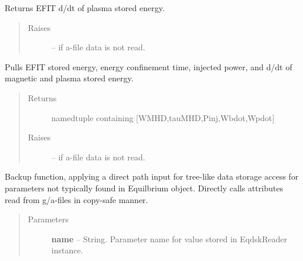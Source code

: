 \documentclass[letterpaper,10pt,english]{sphinxmanual}
\begin{document}
\begin{fulllineitems}
\begin{fulllineitems}
\end{fulllineitems}


\begin{fulllineitems}
\label{eqtools:eqtools.eqdskreader.EqdskReader.getWpdot}
Returns EFIT d/dt of plasma stored energy.
\begin{quote}\begin{description}
\item[{Raises }] \leavevmode
{} -- 
if a-file data is not read.

\end{description}\end{quote}

\end{fulllineitems}


\begin{fulllineitems}
\label{eqtools:eqtools.eqdskreader.EqdskReader.getEnergy}
Pulls EFIT stored energy, energy confinement time, injected power, and d/dt of magnetic and plasma stored energy.
\begin{quote}\begin{description}
\item[{Returns}] \leavevmode
namedtuple containing {[}WMHD,tauMHD,Pinj,Wbdot,Wpdot{]}

\item[{Raises }] \leavevmode
{} -- 
if a-file data is not read.

\end{description}\end{quote}

\end{fulllineitems}


\begin{fulllineitems}
\label{eqtools:eqtools.eqdskreader.EqdskReader.getParam}
Backup function, applying a direct path input for tree-like data storage access
for parameters not typically found in Equilbrium object.  Directly calls attributes
read from g/a-files in copy-safe manner.
\begin{quote}\begin{description}
\item[{Parameters }] \leavevmode
\textbf{name} --
String.
Parameter name for value stored in EqdskReader instance.


\end{description}
\end{quote}
\end{fulllineitems}
\end{fulllineitems}
\end{document}
